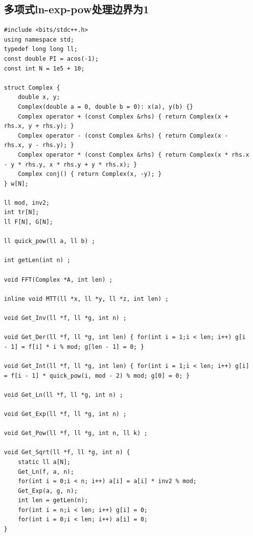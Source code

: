 \documentclass[twoside]{article}
\begin{document}
\subsection{多项式ln-exp-pow处理边界为1}
\begin{lstlisting}
#include <bits/stdc++.h>
using namespace std;
typedef long long ll;
const double PI = acos(-1);
const int N = 1e5 + 10;

struct Complex {
    double x, y;
    Complex(double a = 0, double b = 0): x(a), y(b) {}
    Complex operator + (const Complex &rhs) { return Complex(x + rhs.x, y + rhs.y); }
    Complex operator - (const Complex &rhs) { return Complex(x - rhs.x, y - rhs.y); }
    Complex operator * (const Complex &rhs) { return Complex(x * rhs.x - y * rhs.y, x * rhs.y + y * rhs.x); }
    Complex conj() { return Complex(x, -y); }
} w[N];

ll mod, inv2;
int tr[N];
ll F[N], G[N];

ll quick_pow(ll a, ll b) ;

int getLen(int n) ;

void FFT(Complex *A, int len) ;

inline void MTT(ll *x, ll *y, ll *z, int len) ;

void Get_Inv(ll *f, ll *g, int n) ;

void Get_Der(ll *f, ll *g, int len) { for(int i = 1;i < len; i++) g[i - 1] = f[i] * i % mod; g[len - 1] = 0; }

void Get_Int(ll *f, ll *g, int len) { for(int i = 1;i < len; i++) g[i] = f[i - 1] * quick_pow(i, mod - 2) % mod; g[0] = 0; }

void Get_Ln(ll *f, ll *g, int n) ;

void Get_Exp(ll *f, ll *g, int n) ;

void Get_Pow(ll *f, ll *g, int n, ll k) ;

void Get_Sqrt(ll *f, ll *g, int n) {
    static ll a[N];
    Get_Ln(f, a, n);
    for(int i = 0;i < n; i++) a[i] = a[i] * inv2 % mod;
    Get_Exp(a, g, n);
    int len = getLen(n);
    for(int i = n;i < len; i++) g[i] = 0;
    for(int i = 0;i < len; i++) a[i] = 0;
}

\end{lstlisting}
\end{document}
